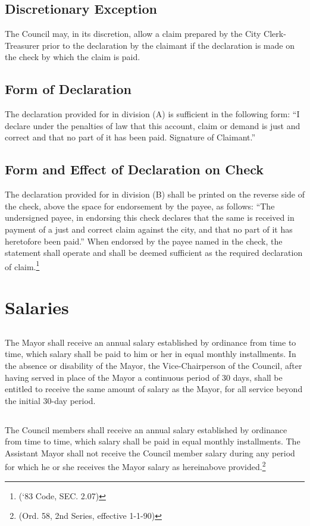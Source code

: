 \subsection{Discretionary Exception} The Council may, in its discretion, allow a claim prepared by the City Clerk-Treasurer prior to the declaration by the claimant if the declaration is made on the check by which the claim is paid.
\subsection{Form of Declaration} The declaration provided for in division (A) is sufficient in the following form: “I declare under the penalties of law that this account, claim or demand is just and correct and that no part of it has been paid. Signature of Claimant.”
\subsection{Form and Effect of Declaration on Check} The declaration provided for in division (B) shall be printed on the reverse side of the check, above the space for endorsement by the payee, as follows: “The undersigned payee, in endorsing this check declares that the same is received in payment of a just and correct claim against the city, and that no part of it has heretofore been paid.” When endorsed by the payee named in the check, the statement shall operate and shall be deemed sufficient as the required declaration of claim.\footnote{(‘83 Code, SEC. 2.07)}

\section{Salaries}
\subsection{}
The Mayor shall receive an annual salary established by ordinance from time to time, which salary shall be paid to him or her in equal monthly installments.  In the absence or disability of the Mayor, the Vice-Chairperson of the Council, after having served in place of the Mayor a continuous period of 30 days, shall be entitled to receive the same amount of salary as the Mayor, for all service beyond the initial 30-day period.
\subsection{}
The Council members shall receive an annual salary established by ordinance from time to time, which salary shall be paid in equal monthly installments.  The Assistant Mayor shall not receive the Council member salary during any period for which he or she receives the Mayor salary as hereinabove provided.\footnote{(Ord. 58, 2nd Series, effective 1-1-90)}
